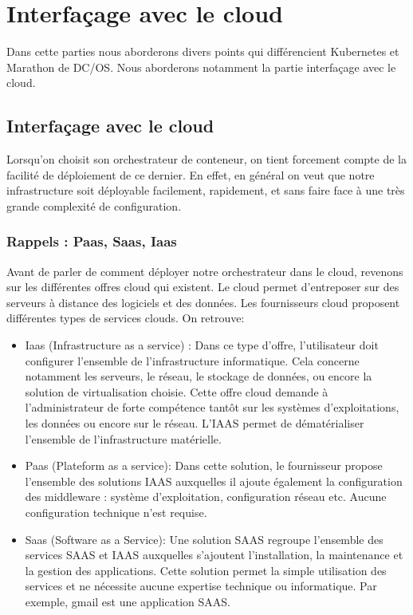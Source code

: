 \documentclass[11pt,fleqn]{book} %
\begin{document}
\chapter{Interfaçage avec le cloud }
\vspace{-2cm}
Dans cette parties nous aborderons divers points qui différencient Kubernetes et Marathon de DC/OS. Nous aborderons notamment la partie interfaçage avec le cloud.

\section*{Interfaçage avec le cloud}
Lorsqu'on choisit son orchestrateur de conteneur, on tient forcement compte de la facilité de déploiement de ce dernier. En effet, en général on veut que notre infrastructure soit déployable facilement, rapidement, et sans faire face à une très grande complexité de configuration.

\subsection*{Rappels : Paas, Saas, Iaas}
Avant de parler de comment déployer notre orchestrateur dans le cloud, revenons sur les différentes offres cloud qui existent. Le cloud permet d’entreposer sur des serveurs à distance des logiciels et des données. Les fournisseurs cloud proposent différentes types de services clouds. On retrouve:
\begin{itemize}
    \item Iaas (Infrastructure as a service) : Dans ce type d'offre, l'utilisateur doit configurer l'ensemble de l'infrastructure informatique. Cela concerne notamment les serveurs, le réseau, le stockage de données, ou encore la solution de virtualisation choisie. Cette offre cloud demande à l'administrateur de forte compétence tantôt sur les systèmes d'exploitations, les données ou encore sur le réseau. L'IAAS permet de dématérialiser l'ensemble de l'infrastructure matérielle.
    \item Paas (Plateform as a service): Dans cette solution, le fournisseur propose l'ensemble des solutions IAAS auxquelles il ajoute également la configuration des middleware : système d'exploitation, configuration réseau etc. Aucune configuration technique n'est requise.
    \item Saas (Software as a Service): Une solution SAAS regroupe l'ensemble des services SAAS et IAAS auxquelles s'ajoutent l'installation, la maintenance et la gestion des applications. Cette solution permet la simple utilisation des services et ne nécessite aucune expertise technique ou informatique. Par exemple, gmail est une application SAAS.\\
\end{itemize}
\end{document}
